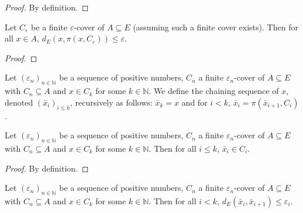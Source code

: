 \begin{proof}\leanok
By definition.
\end{proof}


\begin{lemma}\label{lem:dist_nearestPt_of_isCover}
  \leanok
Let $C_\varepsilon$ be a finite $\varepsilon$-cover of $A \subseteq E$ (assuming such a finite cover exists).
Then for all $x \in A$, $d_E(x, \pi(x, C_\varepsilon)) \le \varepsilon$.
\end{lemma}

\begin{proof}\leanok

\end{proof}


\begin{definition}\label{def:chainingSequence}
  \leanok
Let $(\varepsilon_n)_{n \in \mathbb{N}}$ be a sequence of positive numbers, $C_n$ a finite $\varepsilon_n$-cover of $A \subseteq E$ with $C_n \subseteq A$ and $x \in C_k$ for some $k \in \mathbb{N}$.
We define the chaining sequence of $x$, denoted $(\bar{x}_i)_{i \le k}$, recursively as follows: $\bar{x}_k = x$ and for $i < k$, $\bar{x}_i = \pi(\bar{x}_{i+1}, C_i)$.
\end{definition}


\begin{lemma}\label{lem:chainingSequence_mem}
  \leanok
Let $(\varepsilon_n)_{n \in \mathbb{N}}$ be a sequence of positive numbers, $C_n$ a finite $\varepsilon_n$-cover of $A \subseteq E$ with $C_n \subseteq A$ and $x \in C_k$ for some $k \in \mathbb{N}$.
Then for all $i \le k$, $\bar{x}_i\in C_i$.
\end{lemma}

\begin{proof}\leanok
By definition.
\end{proof}


\begin{lemma}\label{lem:dist_chainingSequence_add_one}
  \leanok
Let $(\varepsilon_n)_{n \in \mathbb{N}}$ be a sequence of positive numbers, $C_n$ a finite $\varepsilon_n$-cover of $A \subseteq E$ with $C_n \subseteq A$ and $x \in C_k$ for some $k \in \mathbb{N}$.
Then for all $i < k$, $d_E(\bar{x}_i, \bar{x}_{i+1}) \le \varepsilon_i$.
\end{lemma}

